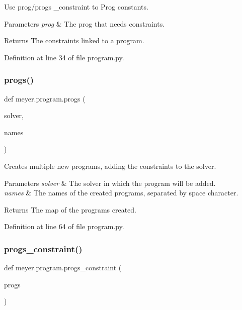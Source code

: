 Use prog/progs \+\_\+constraint to Prog constants. 


\begin{DoxyParams}{Parameters}
{\em prog} & The prog that needs constraints. \\
\hline
\end{DoxyParams}
\begin{DoxyReturn}{Returns}
The constraints linked to a program. 
\end{DoxyReturn}


Definition at line 34 of file program.\+py.

\mbox{\label{namespacemeyer_1_1program_ae0fe8928ca6b44bea0484d83cb8b98dc}} 
\subsubsection{\texorpdfstring{progs()}{progs()}}
{\footnotesize\ttfamily def meyer.\+program.\+progs (\begin{DoxyParamCaption}\item[{}]{solver,  }\item[{}]{names }\end{DoxyParamCaption})}



Creates multiple new programs, adding the constraints to the solver. 


\begin{DoxyParams}{Parameters}
{\em solver} & The solver in which the program will be added. \\
\hline
{\em names} & The names of the created programs, separated by space character. \\
\hline
\end{DoxyParams}
\begin{DoxyReturn}{Returns}
The map of the programs created. 
\end{DoxyReturn}


Definition at line 64 of file program.\+py.

\mbox{\label{namespacemeyer_1_1program_aa1b9b5b66171bc75ca42d795003ada41}} 
\subsubsection{\texorpdfstring{progs\+\_\+constraint()}{progs\_constraint()}}
{\footnotesize\ttfamily def meyer.\+program.\+progs\+\_\+constraint (\begin{DoxyParamCaption}\item[{}]{progs }\end{DoxyParamCaption})}



